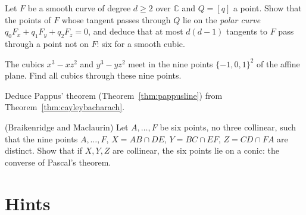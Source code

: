 \begin{exercise}[$\star\star$]\label{ex:polarcurve}
Let $F$ be a smooth curve of degree $d\ge2$ over $\mathbb C$ and $Q=[q]$ a point. Show that the points of $F$ whose tangent passes through $Q$ lie on the
\emph{polar curve} $q_0F_x+q_1F_y+q_2F_z=0$, and deduce that at most $d(d-1)$ tangents to $F$ pass through a point not on $F$: six for a smooth cubic.
\end{exercise}

\begin{exercise}[$\star$]\label{ex:cramergrid}
The cubics $x^3-xz^2$ and $y^3-yz^2$ meet in the nine points $\{-1,0,1\}^2$ of the affine plane. Find all cubics through these nine points.
\end{exercise}

\begin{exercise}[$\star\star$]\label{ex:cbpappus}
Deduce Pappus' theorem (Theorem~\ref{thm:pappusline}) from Theorem~\ref{thm:cayleybacharach}.
\end{exercise}

\begin{exercise}[$\star\star\star$]\label{ex:braikenridge}
(Braikenridge and Maclaurin) Let $A,\dots,F$ be six points, no three collinear, such that the nine points $A,\dots,F$, $X=AB\cap DE$, $Y=BC\cap EF$,
$Z=CD\cap FA$ are distinct. Show that if $X,Y,Z$ are collinear, the six points lie on a conic: the converse of Pascal's theorem.
\end{exercise}

\section{Hints}

